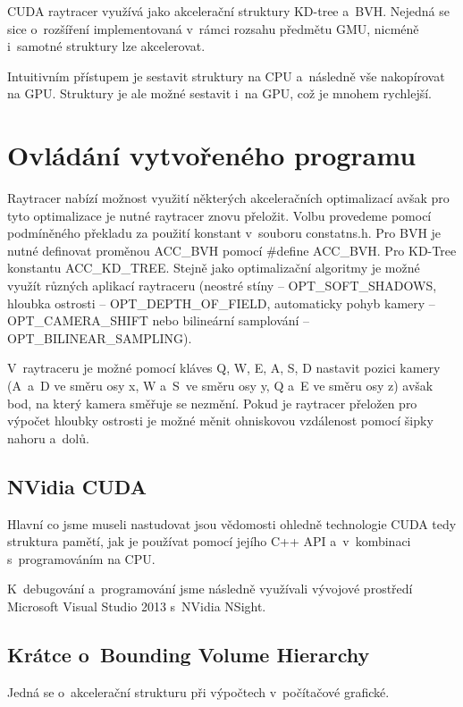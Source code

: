 \documentclass[12pt,a4paper,titlepage,final]{report}
\begin{document}
CUDA raytracer využívá jako akcelerační struktury KD-tree a~BVH. Nejedná se sice o~rozšíření implementovaná v~rámci rozsahu předmětu GMU, nicméně i~samotné struktury lze akcelerovat.

Intuitivním přístupem je sestavit struktury na CPU a~následně vše nakopírovat na GPU. Struktury je ale možné sestavit i~na GPU, což je mnohem rychlejší. \cite{karras}



\section{Ovládání vytvořeného programu}

Raytracer nabízí možnost využití některých akceleračních optimalizací avšak pro tyto optimalizace je nutné raytracer znovu přeložit. Volbu provedeme pomocí podmíněného překladu za použití konstant v~souboru constatns.h. Pro BVH je nutné definovat proměnou ACC\_BVH pomocí \#define ACC\_BVH. Pro KD-Tree konstantu ACC\_KD\_TREE. Stejně jako optimalizační algoritmy je možné využít různých aplikací raytraceru (neostré  stíny -- OPT\_SOFT\_SHADOWS, hloubka ostrosti -- OPT\_DEPTH\_OF\_FIELD, automaticky pohyb kamery -- OPT\_CAMERA\_SHIFT nebo bilineární samplování -- OPT\_BILINEAR\_SAMPLING). 

V~raytraceru je možné pomocí kláves Q, W, E, A, S, D nastavit pozici kamery (A~a~D ve směru osy x, W a~S~ve směru osy y, Q a~E ve směru osy z) avšak bod, na který kamera směřuje se nezmění. Pokud je raytracer přeložen pro výpočet hloubky ostrosti je možné měnit ohniskovou vzdálenost pomocí šipky nahoru a~dolů.




\subsection{NVidia CUDA}
Hlavní co jsme museli nastudovat jsou vědomosti ohledně technologie CUDA tedy struktura pamětí, jak je používat pomocí jejího C++ API a~v~kombinaci s~programováním na CPU.

K~debugování a~programování jsme následně využívali vývojové prostředí Microsoft Visual Studio 2013 s~NVidia NSight.

\subsection{Krátce o~Bounding Volume Hierarchy}
Jedná se o~akcelerační strukturu při výpočtech v~počítačové grafické.
\end{document}
